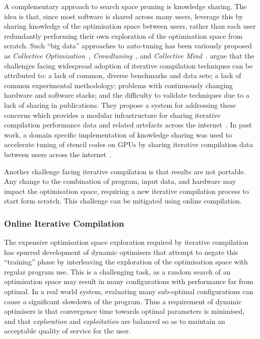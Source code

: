 A complementary approach to search space pruning is knowledge sharing. The idea is that, since most software is shared across many users, leverage this by sharing knowledge of the optimisation space between users, rather than each user redundantly performing their own exploration of the optimisation space from scratch. Such ``big data'' approaches to auto-tuning has been variously proposed as
\emph{Collective Optimization}~\cite{Saclay2010},
\emph{Crowdtuning}~\cite{Memon2013},
and \emph{Collective Mind}~\cite{Fursin2014}.%
\citeauthor{Fursin2014} argue that the challenges facing widespread adoption of iterative compilation techniques can be attributed to: a lack of common, diverse benchmarks and data sets; a lack of common experimental methodology; problems with continuously changing hardware and software stacks; and the difficulty to validate techniques due to a lack of sharing in publications. They propose a system for addressing these concerns which provides a modular infrastructure for sharing iterative compilation performance data and related artefacts across the internet~\cite{Fursin2014}.
In past work, a domain specific implementation of knowledge sharing was used to accelerate tuning of stencil codes on GPUs by sharing iterative compilation data between users across the internet~\cite{Cummins2016}.

Another challenge facing iterative compilation is that results are not portable. Any change to the combination of program, input data, and hardware may impact the optimisation space, requiring a new iterative compilation process to start form scratch. This challenge can be mitigated using online compilation.


\subsubsection{Online Iterative Compilation}

The expensive optimisation space exploration required by iterative compilation has spurred development of dynamic optimisers that attempt to negate this ``training'' phase by interleaving the exploration of the optimisation space with regular program use. This is a challenging task, as a random search of an optimisation space may result in many configurations with performance far from optimal. In a real world system, evaluating many sub-optimal configurations can cause a significant slowdown of the program. Thus a requirement of dynamic optimisers is that convergence time towards optimal parameters is minimised, and that \emph{exploration} and \emph{exploitation} are balanced so as to maintain an acceptable quality of service for the user.

